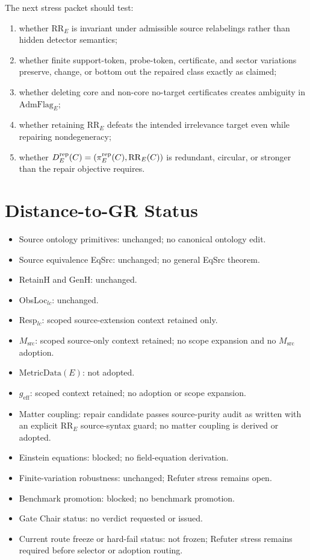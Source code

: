 The next stress packet should test:
\begin{enumerate}
  \item whether \(\mathrm{RR}_E\) is invariant under admissible source
    relabelings rather than hidden detector semantics;
  \item whether finite support-token, probe-token, certificate, and sector
    variations preserve, change, or bottom out the repaired class exactly as
    claimed;
  \item whether deleting core and non-core no-target certificates creates
    ambiguity in \(\mathrm{AdmFlag}_E\);
  \item whether retaining \(\mathrm{RR}_E\) defeats the intended irrelevance
    target even while repairing nondegeneracy;
  \item whether \(D^{\mathrm{rep}}_E(C)=(\pi^{\mathrm{rep}}_E(C),\mathrm{RR}_E(C))\) is
    redundant, circular, or stronger than the repair objective requires.
\end{enumerate}

\section{Distance-to-GR Status}

\begin{itemize}
  \item Source ontology primitives: unchanged; no canonical ontology edit.
  \item Source equivalence EqSrc: unchanged; no general EqSrc theorem.
  \item RetainH and GenH: unchanged.
  \item ObsLoc\(_{lc}\): unchanged.
  \item Resp\(_{lc}\): scoped source-extension context retained only.
  \item \(M_{\mathrm{src}}\): scoped source-only context retained; no scope
    expansion and no \(M_{\mathrm{src}}\) adoption.
  \item \(\mathrm{MetricData}(E)\): not adopted.
  \item \(g_{\mathrm{eff}}\): scoped context retained; no adoption or scope
    expansion.
  \item Matter coupling: repair candidate passes source-purity audit as
    written with an explicit \(\mathrm{RR}_E\) source-syntax guard; no matter
    coupling is derived or adopted.
  \item Einstein equations: blocked; no field-equation derivation.
  \item Finite-variation robustness: unchanged; Refuter stress remains open.
  \item Benchmark promotion: blocked; no benchmark promotion.
  \item Gate Chair status: no verdict requested or issued.
  \item Current route freeze or hard-fail status: not frozen; Refuter stress
    remains required before selector or adoption routing.
\end{itemize}

